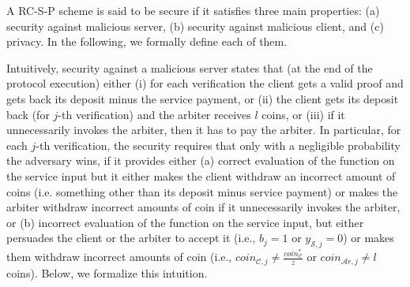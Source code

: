 
A RC-S-P scheme is said to be secure if it satisfies  three main properties: (a)  security against malicious server, (b) security against malicious client, and (c) privacy.  In the following, we formally define each of them.

 Intuitively, security against a malicious server states that (at the end of the protocol execution) either (i) for each verification the client gets a valid proof and gets back its deposit minus the service payment, or (ii) the client gets its deposit back (for $j$-th verification) and the arbiter receives $l$ coins, or (iii) if it unnecessarily invokes the arbiter, then it has to pay the arbiter. In particular, for each $j$-th verification, the security requires that only with a negligible probability the adversary wins, if it  provides either (a)  correct evaluation of the function on the service input but it either makes the client  withdraw an incorrect amount of coins (i.e. something other than its deposit minus service payment) or makes the arbiter withdraw incorrect amounts of coin if it unnecessarily invokes the arbiter, or (b) incorrect evaluation of the function on the service input,  but either persuades the client or the arbiter to accept it (i.e.,  $b_{\scriptscriptstyle j}=1$ or $y_{\scriptscriptstyle\mathcal S,j}=0$) or makes them  withdraw incorrect amounts of coin (i.e., $coin_{\scriptscriptstyle\mathcal{C},j}\neq \frac{coin_{\scriptscriptstyle\mathcal C}^{\scriptscriptstyle*}}{z}$ or  $coin_{\scriptscriptstyle\mathcal{A}r,j}\neq l$ coins).  Below, we formalize this intuition. 






